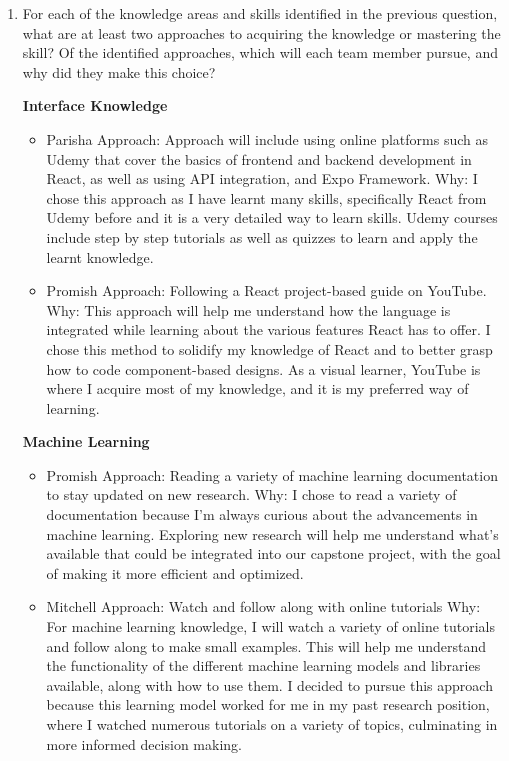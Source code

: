 \documentclass[12pt]{article}
\begin{document}
\begin{enumerate}
  \item For each of the knowledge areas and skills identified in the previous
  question, what are at least two approaches to acquiring the knowledge or
  mastering the skill?  Of the identified approaches, which will each team
  member pursue, and why did they make this choice?

  \textbf{Interface Knowledge} 
  \begin{itemize}
    \item Parisha 
    \subitem Approach: Approach will include using online platforms such as Udemy that cover the basics of frontend and backend development in React, 
    as well as using API integration, and Expo Framework. 
    \subitem Why: I chose this approach as I have learnt many skills, specifically React from Udemy before and it is a very detailed way to learn skills. 
    Udemy courses include step by step tutorials as well as quizzes to learn and apply the learnt knowledge. 
    \item Promish 
    \subitem Approach: Following a React project-based guide on YouTube.
    \subitem Why: This approach will help me understand how the language is integrated while learning about the various features React has to offer. 
  I chose this method to solidify my knowledge of React and to better grasp how to code component-based designs. As a visual learner, YouTube is where I acquire most of my knowledge, and it is my preferred way of learning.
  \end{itemize}

  \textbf{Machine Learning} 
  \begin{itemize}
    \item Promish 
    \subitem Approach: Reading a variety of machine learning documentation to stay updated on new research.
    \subitem Why: I chose to read a variety of documentation because I'm always curious about the advancements in machine learning. Exploring new research will help me understand what's available that could be integrated into our capstone project, with the goal of making it more efficient and optimized. 
    \item Mitchell 
    \subitem Approach: Watch and follow along with online tutorials
    \subitem Why: For machine learning knowledge, I will watch a variety of online tutorials and follow along to make small examples. This will help me understand the functionality of the different machine learning models and libraries available, along with how to use them. I decided to pursue this approach because this learning model worked for me in my past research position, where I watched numerous tutorials on a variety of topics, culminating in more informed decision making.
  \end{itemize}


\end{enumerate}
\end{document}
